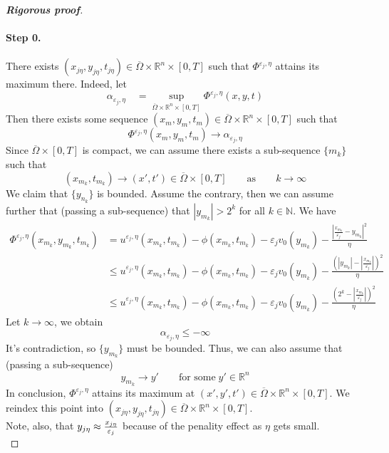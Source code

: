 \documentclass[12pt, oneside]{amsart}  	%
\begin{document}
\begin{proof}[\textbf{Rigorous proof}]
\paragraph{\textbf{Step 0.}} There exists $\left(x_{j\eta},y_{j\eta},t_{j\eta}\right)\in \overline{\Omega}\times\mathbb{R}^n\times [0,T]$ such that $\Phi^{\varepsilon_j,\eta}$ attains its maximum there. Indeed, let
\begin{equation*}
\alpha_{\varepsilon_j,\eta}\quad  = \sup_{ \overline{\Omega}\times\mathbb{R}^n\times [0,T]} \Phi^{\varepsilon_j,\eta} (x,y,t)
\end{equation*}
Then there exists some sequence $(x_m,y_m,t_m)\in \overline{\Omega}\times\mathbb{R}^n\times [0,T]$ such that 
\begin{equation*}
\Phi^{\varepsilon_j, \eta}(x_m,y_m,t_m)\longrightarrow \alpha_{\varepsilon_j,\eta}
\end{equation*}
Since $\overline{\Omega}\times [0,T]$ is compact, we can assume there exists a sub-sequence $\{m_k\}$ such that $$\left(x_{m_k},t_{m_k}\right) \longrightarrow (x',t')\in \overline{\Omega}\times[0,T]\qquad\text{as}\qquad k\longrightarrow\infty$$
We claim that $\{y_{n_k}\}$ is bounded. Assume the contrary, then we can assume further that (passing a sub-sequence) that $\left|y_{m_k}\right| > 2^k$ for all $k\in \mathbb{N}$. We have
\begin{align*}
\Phi^{\varepsilon_j,\eta}\left(x_{m_k},y_{m_k},t_{m_k}\right) &= u^{\varepsilon_j,\eta}\left(x_{m_k},t_{m_k}\right) - \phi\left(x_{m_k},t_{m_k}\right) - \varepsilon_jv_0\left(y_{m_k}\right) - \frac{\left|\frac{x_{m_k}}{\varepsilon_j} - y_{m_k}\right|^2}{\eta}\\
&\leq u^{\varepsilon_j,\eta}\left(x_{m_k},t_{m_k}\right) - \phi\left(x_{m_k},t_{m_k}\right) - \varepsilon_jv_0\left(y_{m_k}\right) - \frac{\left( \left|y_{m_k}\right| - \left|\frac{x_{m_k}}{\varepsilon_j}\right|   \right)^2}{\eta}\\
&\leq u^{\varepsilon_j,\eta}\left(x_{m_k},t_{m_k}\right) - \phi\left(x_{m_k},t_{m_k}\right) - \varepsilon_jv_0\left(y_{m_k}\right) - \frac{\left( 2^k - \left|\frac{x_{m_k}}{\varepsilon_j}\right|   \right)^2}{\eta}
\end{align*}
Let $k\longrightarrow\infty$, we obtain
\begin{equation*}
\alpha_{\varepsilon_j,\eta} \leq -\infty
\end{equation*}
It's contradiction, so $\{y_{m_k}\}$ must be bounded. Thus, we can also assume that (passing a sub-sequence)
\begin{equation*}
y_{m_k} \longrightarrow y' \qquad\text{for some}\;y'\in \mathbb{R}^n
\end{equation*}
In conclusion, $\Phi^{\varepsilon_j,\eta}$ attains its maximum at $(x',y',t') \in \overline{\Omega} \times \mathbb{R}^n\times [0,T]$. We reindex this point into $\left(x_{j\eta},y_{j\eta},t_{j\eta}\right)\in \overline{\Omega}\times\mathbb{R}^n\times [0,T]$.\\
Note, also, that $y_{j\eta}\approx \frac{x_{j\eta}}{\varepsilon_j}$ because of the penality effect as $\eta$ gets small.\\


\end{proof}
\end{document}
